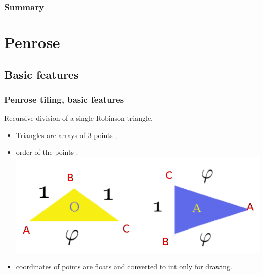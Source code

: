 \documentclass{beamer}
\begin{document}
	\begin{frame}
		\frametitle{Summary}
		\tableofcontents
	\end{frame}
	
	\section{Penrose}
	\subsection{Basic features}
	\begin{frame}
		\frametitle{Penrose tiling, basic features}
		Recursive division of a single Robinson triangle.
		
		
		\begin{itemize}
			\item Triangles are arrays of 3 points ;
			\item order of the points :
				\vspace{-0.4cm}\\
				\hspace{4cm}
				\includegraphics[scale=0.25]{naming_triangles.png}
			\item coordinates of points are floats and converted to int only for drawing.
		\end{itemize}
	\end{frame}
	
\end{document}
